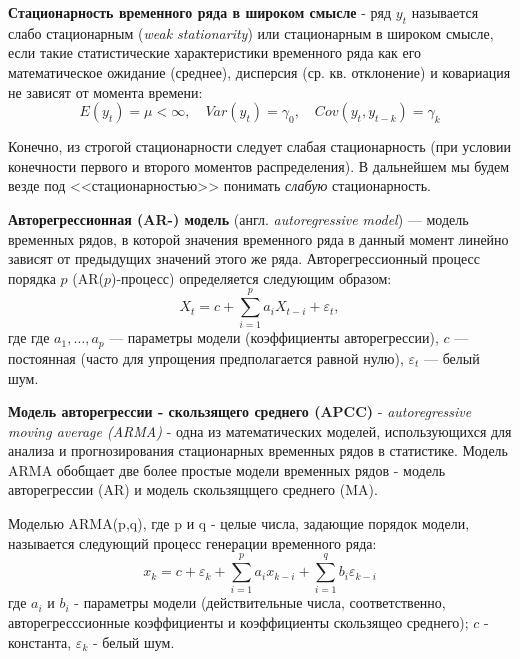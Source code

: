 \documentclass{article}
\begin{document}
  \textbf{Стационарность временного ряда в широком смысле} - ряд $y_t$ называется слабо стационарным (\textsl{weak stationarity}) или стационарным в широком смысле, если такие статистические характеристики временного ряда как его математическое ожидание (среднее), дисперсия (ср. кв. отклонение) и ковариация не зависят от момента времени:
  \begin{equation}
    {E(y_t) = \mu < \infty, \quad Var(y_t) = \gamma_0, \quad Cov(y_t, y_{t-k}) = \gamma_k}
  \end{equation}\par
  
  Конечно, из строгой стационарности следует слабая стационарность (при условии конечности первого и второго моментов распределения). В дальнейшем мы будем везде под <<стационарностью>> понимать \textsl{слабую} стационарность.\par 
  
  \textbf{Авторегрессионная (AR-) модель} (англ. \textsl{autoregressive model}) — модель временных рядов, в которой значения временного ряда в данный момент линейно зависят от предыдущих значений этого же ряда. Авторегрессионный процесс порядка $p$ (AR($p$)-процесс) определяется следующим образом:
  \begin{equation}
      X_t = c + \sum\limits_{i=1}^{p} a_i X_{t-i} + \varepsilon_t ,
  \end{equation}
  где где $a_1,\ldots ,a_p$ — параметры модели (коэффициенты авторегрессии), $c$ — постоянная (часто для упрощения предполагается равной нулю), $\varepsilon_t$ — белый шум.\par
  
  \textbf{Модель авторегрессии - скользящего среднего (APCC)} - \textsl{autoregressive moving average (ARMA)} - одна из математических моделей, использующихся для анализа и прогнозирования стационарных временных рядов в статистике. Модель ARMA обобщает две более простые модели временных рядов - модель авторегрессии (AR) и модель скользящщего среднего (MA). \par
  
  Моделью ARMA(p,q), где p и q - целые числа, задающие порядок модели, называется следующий процесс генерации временного ряда:
  \begin{equation}
  	x_k = c + \varepsilon_k + \sum\limits_{i=1}^p a_i x_{k-i} + \sum\limits_{i=1}^q b_i \varepsilon_{k-i}
  \end{equation}
  где $a_i$ и $b_i$ - параметры модели (действительные числа, соответственно, авторегресссионные коэффициенты и коэффициенты скользящео среднего); $c$ - константа, $\varepsilon_k$ - белый шум. \par
  
\end{document}
